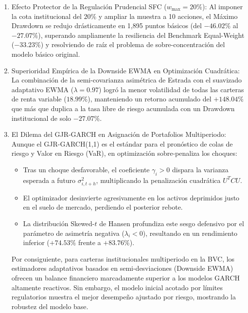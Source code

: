 \documentclass[11pt,a4paper]{article}
\begin{document}
\begin{enumerate}
    \item Efecto Protector de la Regulación Prudencial SFC ($w_{\max} = 20\%$):
    Al imponer la cota institucional del $20\%$ y ampliar la muestra a 10 acciones, el Máximo Drawdown se redujo drásticamente en 1,895 puntos básicos (del $-46.02\%$ al $-27.07\%$), superando ampliamente la resiliencia del Benchmark Equal-Weight ($-33.23\%$) y resolviendo de raíz el problema de sobre-concentración del modelo básico original.
    
    \item Superioridad Empírica de la Downside EWMA en Optimización Cuadrática:
    La combinación de la semi-covarianza asimétrica de Estrada con el suavizado adaptativo EWMA ($\lambda=0.97$) logró la menor volatilidad de todas las carteras de renta variable ($18.99\%$), manteniendo un retorno acumulado del $+148.04\%$ que más que duplica a la tasa libre de riesgo acumulada con un Drawdown institucional de solo $-27.07\%$.
    
    \item El Dilema del GJR-GARCH en Asignación de Portafolios Multiperiodo:
    Aunque el GJR-GARCH(1,1) es el estándar para el pronóstico de colas de riesgo y Valor en Riesgo (VaR), en optimización sobre-penaliza los choques:
    \begin{itemize}
        \item Tras un choque desfavorable, el coeficiente $\gamma_i > 0$ dispara la varianza esperada a futuro $\sigma_{i,t+h}^2$, multiplicando la penalización cuadrática $U^T C U$.
        \item El optimizador desinvierte agresivamente en los activos deprimidos justo en el suelo de mercado, perdiendo el posterior rebote.
        \item La distribución Skewed-$t$ de Hansen profundiza este sesgo defensivo por el parámetro de asimetría negativa ($\lambda_i < 0$), resultando en un rendimiento inferior ($+74.53\%$ frente a $+83.76\%$).
    \end{itemize}
    Por consiguiente, para carteras institucionales multiperiodo en la BVC, los estimadores adaptativos basados en semi-desviaciones (Downside EWMA) ofrecen un balance financiero marcadamente superior a los modelos GARCH altamente reactivos. Sin embargo, el modelo inicial acotado por límites regulatorios muestra el mejor desempeño ajustado por riesgo, mostrando la robustez del modelo base.
\end{enumerate}
\end{document}
